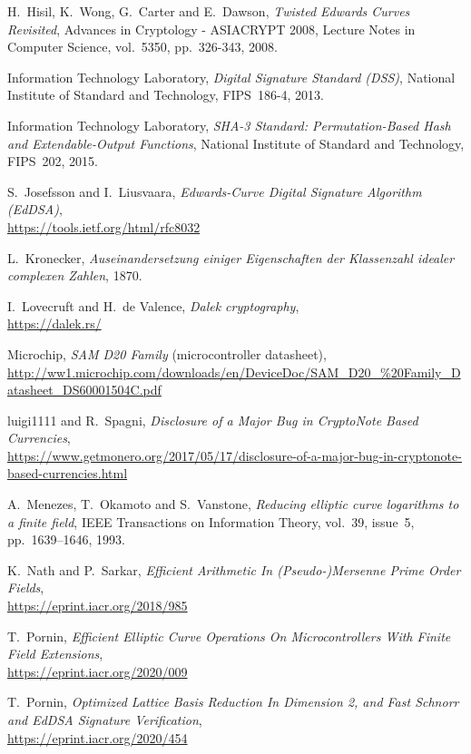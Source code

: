 \documentclass{llncs}
\begin{document}
\begin{thebibliography}{20}
H.~Hisil, K.~Wong, G.~Carter and E.~Dawson,
\emph{Twisted Edwards Curves Revisited},
Advances in Cryptology - ASIACRYPT 2008, Lecture Notes in Computer Science,
vol.~5350, pp.~326-343, 2008.

Information Technology Laboratory,
\emph{Digital Signature Standard (DSS)},
National Institute of Standard and Technology, FIPS~186-4, 2013.

Information Technology Laboratory,
\emph{SHA-3 Standard: Permutation-Based Hash and Extendable-Output Functions},
National Institute of Standard and Technology, FIPS~202, 2015.

S.~Josefsson and I.~Liusvaara,
\emph{Edwards-Curve Digital Signature Algorithm (EdDSA)},\\
\url{https://tools.ietf.org/html/rfc8032}

L.~Kronecker,
\emph{Auseinandersetzung einiger Eigenschaften der Klassenzahl idealer
complexen Zahlen}, 1870.

I.~Lovecruft and H.~de Valence,
\emph{Dalek cryptography},\\
\url{https://dalek.rs/}

Microchip,
\emph{SAM D20 Family} (microcontroller datasheet),
\url{http://ww1.microchip.com/downloads/en/DeviceDoc/SAM_D20_%20Family_Datasheet_DS60001504C.pdf}

luigi1111 and R.~Spagni,
\emph{Disclosure of a Major Bug in CryptoNote Based Currencies},\\
\url{https://www.getmonero.org/2017/05/17/disclosure-of-a-major-bug-in-cryptonote-based-currencies.html}

A.~Menezes, T.~Okamoto and S.~Vanstone,
\emph{Reducing elliptic curve logarithms to a finite field},
IEEE Transactions on Information Theory, vol.~39, issue~5,
pp.~1639–1646, 1993.

K.~Nath and P.~Sarkar,
\emph{Efficient Arithmetic In (Pseudo-)Mersenne Prime Order Fields},\\
\url{https://eprint.iacr.org/2018/985}

T.~Pornin,
\emph{Efficient Elliptic Curve Operations On Microcontrollers With
Finite Field Extensions},\\
\url{https://eprint.iacr.org/2020/009}

T.~Pornin,
\emph{Optimized Lattice Basis Reduction In Dimension 2, and Fast Schnorr
and EdDSA Signature Verification},\\
\url{https://eprint.iacr.org/2020/454}


\end{thebibliography}
\end{document}
